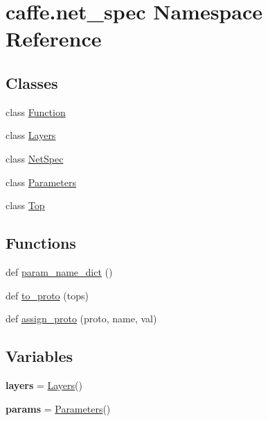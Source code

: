 \hypertarget{namespacecaffe_1_1net__spec}{}\section{caffe.\+net\+\_\+spec Namespace Reference}
\label{namespacecaffe_1_1net__spec}
\subsection*{Classes}
\begin{DoxyCompactItemize}
\item 
class \mbox{\hyperlink{classcaffe_1_1net__spec_1_1_function}{Function}}
\item 
class \mbox{\hyperlink{classcaffe_1_1net__spec_1_1_layers}{Layers}}
\item 
class \mbox{\hyperlink{classcaffe_1_1net__spec_1_1_net_spec}{Net\+Spec}}
\item 
class \mbox{\hyperlink{classcaffe_1_1net__spec_1_1_parameters}{Parameters}}
\item 
class \mbox{\hyperlink{classcaffe_1_1net__spec_1_1_top}{Top}}
\end{DoxyCompactItemize}
\subsection*{Functions}
\begin{DoxyCompactItemize}
\item 
def \mbox{\hyperlink{namespacecaffe_1_1net__spec_a743950197e4a2ce816bcc4ec5bb04968}{param\+\_\+name\+\_\+dict}} ()
\item 
def \mbox{\hyperlink{namespacecaffe_1_1net__spec_a8d5d3cab109867ec42e5e7c2b957e630}{to\+\_\+proto}} (tops)
\item 
def \mbox{\hyperlink{namespacecaffe_1_1net__spec_a823515c8ca21e9562ea594546e167da2}{assign\+\_\+proto}} (proto, name, val)
\end{DoxyCompactItemize}
\subsection*{Variables}
\begin{DoxyCompactItemize}
\item 
\mbox{\label{namespacecaffe_1_1net__spec_aa112f911444ddd4d57694e65b650f944}} 
{\bfseries layers} = \mbox{\hyperlink{classcaffe_1_1net__spec_1_1_layers}{Layers}}()
\item 
\mbox{\label{namespacecaffe_1_1net__spec_a1c4f03ff588b04506ce806eaa7e038b3}} 
{\bfseries params} = \mbox{\hyperlink{classcaffe_1_1net__spec_1_1_parameters}{Parameters}}()
\end{DoxyCompactItemize}


